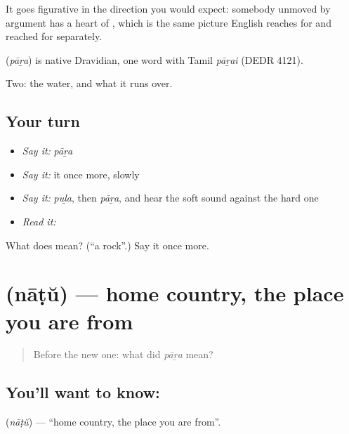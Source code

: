It goes figurative in the direction you would expect: somebody unmoved by argument has a heart of , which is the same picture English reaches for and reached for separately.

\begin{cousinweb}
\textbf{} (\emph{pāṟa}) is native Dravidian, one word with Tamil \emph{pāṟai} (DEDR 4121).
\end{cousinweb}

\begin{grammarlens}[title={What you've built}]
Two: the water, and what it runs over.
\end{grammarlens}

\subsection*{Your turn}
\begin{itemize}
\raggedright
  \item \emph{Say it:} \emph{pāṟa}
  \item \emph{Say it:} it once more, slowly
  \item \emph{Say it:} \emph{puḻa}, then \emph{pāṟa}, and hear the soft sound against the hard one
  \item \emph{Read it:} \textbf{}
\end{itemize}

\begin{tcolorbox}[breakable,colback=teal!4,colframe=teal!35!black,title={Before you move on}]
What does  mean? (\textquotedblleft{}a rock\textquotedblright{}.) Say it once more.
\end{tcolorbox}
\section[\texorpdfstring{\ml{നാട്} (nāṭŭ)}{നാട് (nāṭŭ)}]{ (nāṭŭ) — home country, the place you are from}

\label{lesson:ML-C55-homeland}



\begin{quote}
Before the new one: what did \emph{pāṟa} mean?
\end{quote}

\subsection*{You'll want to know: }
\textbf{} (\emph{nāṭŭ}) — \textquotedblleft{}home country, the place you are from\textquotedblright{}.

